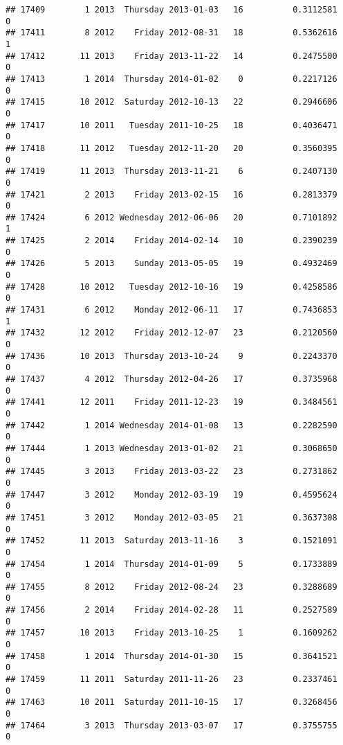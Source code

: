 \documentclass[
]{article}
\begin{document}
\begin{verbatim}
## 17409        1 2013  Thursday 2013-01-03   16          0.3112581             0
## 17411        8 2012    Friday 2012-08-31   18          0.5362616             1
## 17412       11 2013    Friday 2013-11-22   14          0.2475500             0
## 17413        1 2014  Thursday 2014-01-02    0          0.2217126             0
## 17415       10 2012  Saturday 2012-10-13   22          0.2946606             0
## 17417       10 2011   Tuesday 2011-10-25   18          0.4036471             0
## 17418       11 2012   Tuesday 2012-11-20   20          0.3560395             0
## 17419       11 2013  Thursday 2013-11-21    6          0.2407130             0
## 17421        2 2013    Friday 2013-02-15   16          0.2813379             0
## 17424        6 2012 Wednesday 2012-06-06   20          0.7101892             1
## 17425        2 2014    Friday 2014-02-14   10          0.2390239             0
## 17426        5 2013    Sunday 2013-05-05   19          0.4932469             0
## 17428       10 2012   Tuesday 2012-10-16   19          0.4258586             0
## 17431        6 2012    Monday 2012-06-11   17          0.7436853             1
## 17432       12 2012    Friday 2012-12-07   23          0.2120560             0
## 17436       10 2013  Thursday 2013-10-24    9          0.2243370             0
## 17437        4 2012  Thursday 2012-04-26   17          0.3735968             0
## 17441       12 2011    Friday 2011-12-23   19          0.3484561             0
## 17442        1 2014 Wednesday 2014-01-08   13          0.2282590             0
## 17444        1 2013 Wednesday 2013-01-02   21          0.3068650             0
## 17445        3 2013    Friday 2013-03-22   23          0.2731862             0
## 17447        3 2012    Monday 2012-03-19   19          0.4595624             0
## 17451        3 2012    Monday 2012-03-05   21          0.3637308             0
## 17452       11 2013  Saturday 2013-11-16    3          0.1521091             0
## 17454        1 2014  Thursday 2014-01-09    5          0.1733889             0
## 17455        8 2012    Friday 2012-08-24   23          0.3288689             0
## 17456        2 2014    Friday 2014-02-28   11          0.2527589             0
## 17457       10 2013    Friday 2013-10-25    1          0.1609262             0
## 17458        1 2014  Thursday 2014-01-30   15          0.3641521             0
## 17459       11 2011  Saturday 2011-11-26   23          0.2337461             0
## 17463       10 2011  Saturday 2011-10-15   17          0.3268456             0
## 17464        3 2013  Thursday 2013-03-07   17          0.3755755             0

\end{verbatim}
\end{document}
